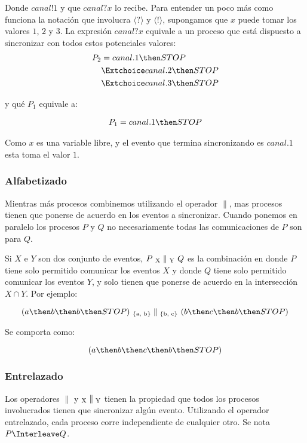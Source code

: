 Donde $canal!1$ y que $canal?x$ lo recibe. Para entender un poco más como funciona la notación que involucra $\langle ? \rangle$ y $\langle ! \rangle$, supongamos que $x$ puede tomar los valores $1$, $2$ y $3$. La expresión $canal?x$ equivale a un proceso que está dispuesto a sincronizar con todos estos potenciales valores:
\begin{align*}
P_2 & =  canal.1 \then STOP \\
      & \Extchoice canal.2 \then STOP \\
      & \Extchoice canal.3 \then STOP 
\end{align*}

y qué $P_1$ equivale a: 

\begin{align*}
P_1  = canal.1 \then STOP \\
\end{align*}

Como $x$ es una variable libre, y el evento que termina sincronizando es $canal.1$ esta toma el valor $1$. 

\subsubsection*{Alfabetizado}

Mientras más procesos combinemos utilizando el operador $\parallel$, mas procesos tienen que ponerse de acuerdo en los eventos a sincronizar. Cuando ponemos en paralelo los procesos $P$ y $Q$ no necesariamente todas las comunicaciones de $P$ son para $Q$.

Si $X$ e $Y$ son dos conjunto de eventos, $P\ \textsubscript{X}\parallel\textsubscript{Y}\ Q$ es la combinación en donde $P$ tiene solo permitido comunicar los eventos $X$ y donde $Q$ tiene solo permitido comunicar los eventos $Y$, y solo tienen que ponerse de acuerdo en la intersección $X \cap Y$. Por ejemplo:

\[ 
 ( a \then b \then b \then STOP )\  \textsubscript{\{a, b\}} \parallel \textsubscript{\{b, c\}}\ ( b \then c \then b \then STOP ) 
\]

Se comporta como:

\[ 
 ( a \then b \then c \then b \then STOP )
\]

\subsubsection*{Entrelazado}
Los operadores $\parallel$ y $\textsubscript{X}\parallel\textsubscript{Y}$ tienen la propiedad que todos los procesos involucrados tienen que sincronizar algún evento. Utilizando el operador entrelazado, cada proceso corre independiente de cualquier otro. Se nota $P \Interleave Q$.

